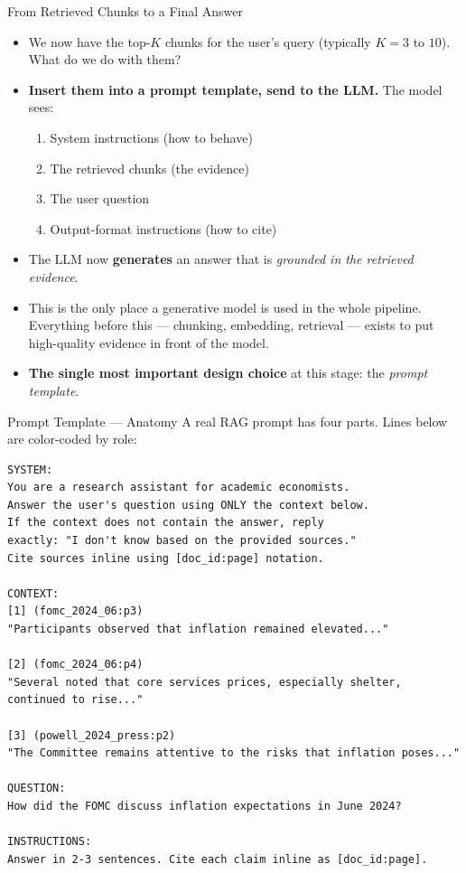 \begin{frame}{From Retrieved Chunks to a Final Answer}
\begin{itemize}
\item We now have the top-$K$ chunks for the user's query (typically $K = 3$ to $10$). What do we do with them?

\medskip
\item \textbf{Insert them into a prompt template, send to the LLM.} The model sees:
\begin{enumerate}
    \item System instructions (how to behave)
    \item The retrieved chunks (the evidence)
    \item The user question
    \item Output-format instructions (how to cite)
\end{enumerate}

\medskip
\item The LLM now \textbf{generates} an answer that is \emph{grounded in the retrieved evidence}.

\medskip
\item This is the only place a generative model is used in the whole pipeline. Everything before this --- chunking, embedding, retrieval --- exists to put high-quality evidence in front of the model.

\medskip
\item \textbf{The single most important design choice} at this stage: the \emph{prompt template}.
\end{itemize}
\end{frame}

\begin{frame}[fragile]{Prompt Template --- Anatomy}
A real RAG prompt has four parts. Lines below are color-coded by role:
\begin{lstlisting}
SYSTEM:
You are a research assistant for academic economists.
Answer the user's question using ONLY the context below.
If the context does not contain the answer, reply
exactly: "I don't know based on the provided sources."
Cite sources inline using [doc_id:page] notation.

CONTEXT:
[1] (fomc_2024_06:p3)
"Participants observed that inflation remained elevated..."

[2] (fomc_2024_06:p4)
"Several noted that core services prices, especially shelter,
continued to rise..."

[3] (powell_2024_press:p2)
"The Committee remains attentive to the risks that inflation poses..."

QUESTION:
How did the FOMC discuss inflation expectations in June 2024?

INSTRUCTIONS:
Answer in 2-3 sentences. Cite each claim inline as [doc_id:page].
\end{lstlisting}
\end{frame}

